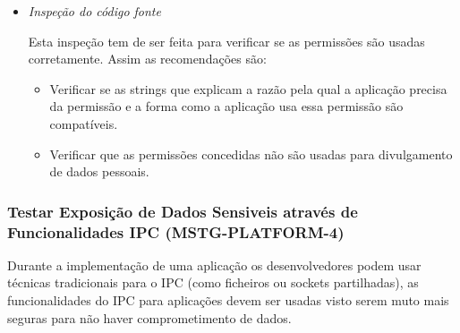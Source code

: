 \begin{itemize}
\item \textit{Inspeção do código fonte}\par
\hfill\par
	Esta inspeção tem de ser feita para verificar se as permissões são usadas corretamente. Assim as recomendações são:\par
	\hfill\par
	\begin{itemize}
		\item Verificar se as strings que explicam a razão pela qual a aplicação precisa da permissão e a forma como a aplicação usa essa permissão são compatíveis.\par
		\hfill\par
		\item Verificar que as permissões concedidas não são usadas para divulgamento de dados pessoais.
	\end{itemize}
\end{itemize}



\subsubsection{Testar Exposição de Dados Sensiveis através de Funcionalidades IPC (MSTG-PLATFORM-4)}
\hfill\par
\hfill\par

Durante a implementação de uma aplicação os desenvolvedores podem usar técnicas tradicionais para o IPC (como ficheiros ou sockets partilhadas), as funcionalidades do IPC para aplicações devem ser usadas visto serem muto mais seguras para não haver comprometimento de dados.\par
\hfill\par

